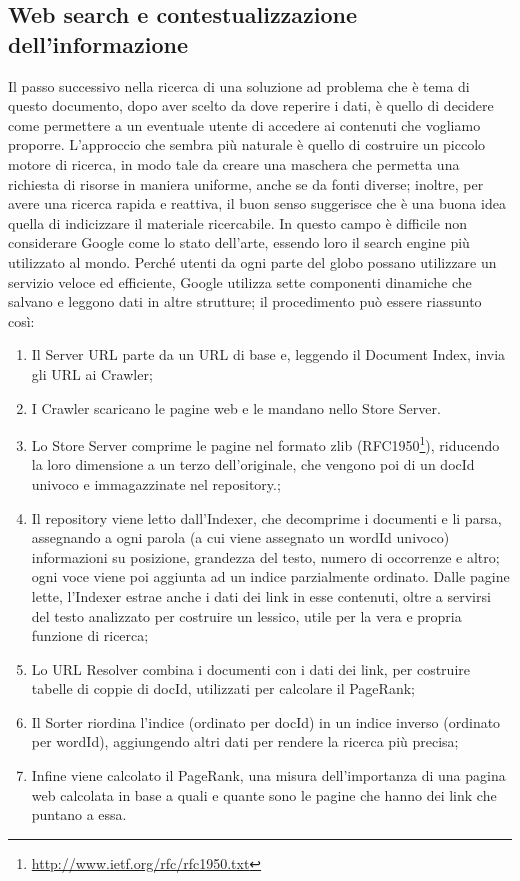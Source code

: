 \documentclass[sigproc-sp.tex]{subfiles}
\begin{document}
\subsection{Web search e contestualizzazione dell’informazione} 
Il passo successivo nella ricerca di una soluzione ad problema che è tema di questo documento, dopo aver scelto da dove reperire i dati, è quello di decidere come permettere a un eventuale utente di accedere ai contenuti che vogliamo proporre. L’approccio che sembra più naturale è quello di costruire un piccolo motore di ricerca, in modo tale da creare una maschera che permetta una richiesta di risorse in maniera uniforme, anche se da fonti diverse; inoltre, per avere una ricerca rapida e reattiva, il buon senso suggerisce che è una buona idea quella di indicizzare il materiale ricercabile.
In questo campo è difficile non considerare Google come lo stato dell’arte, essendo loro il search engine più utilizzato al mondo. Perché utenti da ogni parte del globo possano utilizzare un servizio veloce ed efficiente, Google utilizza sette componenti dinamiche che salvano e leggono dati in altre strutture; il procedimento può essere riassunto così:
\begin{enumerate}
  \item Il Server URL parte da un URL di base e, leggendo il Document Index, invia gli URL ai Crawler;
  \item I Crawler scaricano le pagine web e le mandano nello Store Server.
  \item Lo Store Server comprime le pagine nel formato zlib (RFC1950\footnote{\url{http://www.ietf.org/rfc/rfc1950.txt}}), riducendo la loro dimensione a un terzo dell’originale, che vengono poi di un docId univoco e immagazzinate nel repository.;
  \item Il repository viene letto dall’Indexer, che decomprime i documenti e li parsa, assegnando a ogni parola (a cui viene assegnato un wordId univoco) informazioni su posizione, grandezza del testo, numero di occorrenze e altro; ogni voce viene poi aggiunta ad un indice parzialmente ordinato. Dalle pagine lette, l’Indexer estrae anche i dati dei link in esse contenuti, oltre a servirsi del testo analizzato per costruire un lessico, utile per la vera e propria funzione di ricerca;
  \item Lo URL Resolver combina i documenti con i dati dei link, per costruire tabelle di coppie di docId, utilizzati per calcolare il PageRank;
  \item Il Sorter riordina l’indice (ordinato per docId) in un indice inverso (ordinato per wordId), aggiungendo altri dati per rendere la ricerca più precisa;
  \item Infine viene calcolato il PageRank, una misura dell’importanza di una pagina web calcolata in base a quali e quante sono le pagine che hanno dei link che puntano a essa.
\end{enumerate}
\end{document}
